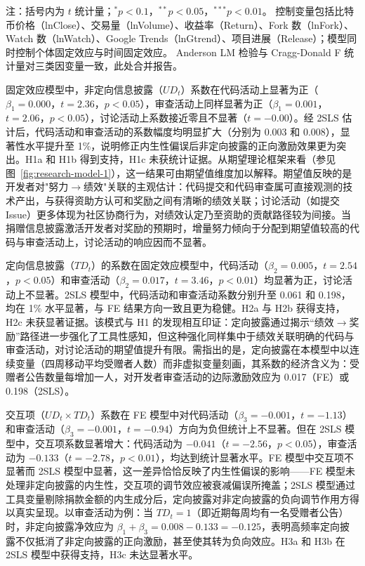 \begin{table}[htbp]
\begin{tabularx}{\textwidth}{Xrrrrrr}
        \bottomrule
    \end{tabularx}
    \begin{minipage}{\textwidth}
        \vspace{0.3em}
        \footnotesize 注：括号内为 $t$ 统计量；$^{*}p<0.1$，$^{**}p<0.05$，$^{***}p<0.01$。
        控制变量包括比特币价格（lnClose）、交易量（lnVolume）、收益率（Return）、Fork 数（lnFork）、Watch 数（lnWatch）、Google Trends（lnGtrend）、项目进展（Release）；模型同时控制个体固定效应与时间固定效应。
        Anderson LM 检验与 Cragg-Donald F 统计量对三类因变量一致，此处合并报告。
    \end{minipage}
\end{table}

固定效应模型中，非定向信息披露（$UD_t$）系数在代码活动上显著为正（$\beta_1 = 0.000$，$t = 2.36$，$p < 0.05$），审查活动上同样显著为正（$\beta_1 = 0.001$，$t = 2.06$，$p < 0.05$），讨论活动上系数接近零且不显著（$t = -0.00$）。经 2SLS 估计后，代码活动和审查活动的系数幅度均明显扩大（分别为 0.003 和 0.008），显著性水平提升至 1\%，说明修正内生性偏误后非定向披露的正向激励效果更为突出。H1a 和 H1b 得到支持，H1c 未获统计证据。从期望理论框架来看（参见图~\ref{fig:research-model-1}），这一结果可由期望值维度加以解释。期望值反映的是开发者对"努力$\to$绩效"关联的主观估计：代码提交和代码审查属可直接观测的技术产出，与获得资助方认可和奖励之间有清晰的绩效关联；讨论活动（如提交 Issue）更多体现为社区协商行为，对绩效认定乃至资助的贡献路径较为间接。当捐赠信息披露激活开发者对奖励的预期时，增量努力倾向于分配到期望值较高的代码与审查活动上，讨论活动的响应因而不显著。

定向信息披露（$TD_t$）的系数在固定效应模型中，代码活动（$\beta_2 = 0.005$，$t = 2.54$，$p < 0.05$）和审查活动（$\beta_2 = 0.017$，$t = 3.46$，$p < 0.01$）均显著为正，讨论活动上不显著。2SLS 模型中，代码活动和审查活动系数分别升至 0.061 和 0.198，均在 1\% 水平显著，与 FE 结果方向一致且更为稳健。H2a 与 H2b 获得支持，H2c 未获显著证据。该模式与 H1 的发现相互印证：定向披露通过揭示“绩效$\to$奖励”路径进一步强化了工具性感知，但这种强化同样集中于绩效关联明确的代码与审查活动，对讨论活动的期望值提升有限。需指出的是，定向披露在本模型中以连续变量（四周移动平均受赠者人数）而非虚拟变量刻画，其系数的经济含义为：受赠者公告数量每增加一人，对开发者审查活动的边际激励效应为 0.017（FE）或 0.198（2SLS）。

交互项（$UD_t \times TD_t$）系数在 FE 模型中对代码活动（$\beta_3 = -0.001$，$t = -1.13$）和审查活动（$\beta_3 = -0.001$，$t = -0.94$）方向为负但统计上不显著。但在 2SLS 模型中，交互项系数显著增大：代码活动为 $-0.041$（$t = -2.56$，$p < 0.05$），审查活动为 $-0.133$（$t = -2.78$，$p < 0.01$），均达到统计显著水平。FE 模型中交互项不显著而 2SLS 模型中显著，这一差异恰恰反映了内生性偏误的影响——FE 模型未处理非定向披露的内生性，交互项的调节效应被衰减偏误所掩盖；2SLS 模型通过工具变量剔除捐款金额的内生成分后，定向披露对非定向披露的负向调节作用方得以真实呈现。以审查活动为例：当 $TD_t = 1$（即近期每周均有一名受赠者公告）时，非定向披露净效应为 $\beta_1 + \beta_3 = 0.008 - 0.133 = -0.125$，表明高频率定向披露不仅抵消了非定向披露的正向激励，甚至使其转为负向效应。H3a 和 H3b 在 2SLS 模型中获得支持，H3c 未达显著水平。

